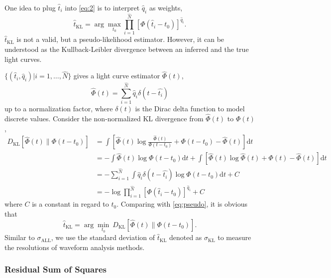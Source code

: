 One idea to plug $\hat{t}_i$ into \eqref{eq:2} is to interpret $\hat{q}_i$ as weights,
\begin{equation}
  \label{eq:pseudo}
  \hat{t}_\mathrm{KL} = \arg\underset{t_0}{\max} \prod_{i=1}^{\hat{N}} \left[\Phi(\hat{t}_i-t_0)\right]^{\hat{q}_i}.
\end{equation}
$\hat{t}_\mathrm{KL}$ is not a valid, but a pseudo-likelihood estimator. However, it can be understood as the Kullback-Leibler divergence between an inferred and the true light curves.

$\{(\hat{t}_i, \hat{q}_i)|i=1,\ldots,\hat{N}\}$ gives a light curve estimator $\hat{\Phi}(t)$,
\begin{equation}
  \label{eq:lc}
  \hat{\Phi}(t) = \sum_{i=1}^{\hat{N}} \hat{q}_i\delta(t-\hat{t_i})
\end{equation}
up to a normalization factor, where $\delta(t)$ is the Dirac delta function to model discrete values.  Consider the non-normalized KL divergence from $\hat{\Phi}(t)$ to $\Phi(t)$,
\begin{equation}
  \begin{aligned}
    D_\mathrm{KL}\left[\hat{\Phi}(t) \parallel \Phi(t-t_0)\right] & =\int \left[\hat{\Phi}(t) \log\frac{\hat{\Phi}(t)}{\Phi(t-t_0)} + \Phi(t-t_0) - \hat{\Phi}(t) \right]\mathrm{d}t \\
    & = - \int \hat{\Phi}(t) \log\Phi(t-t_0)\mathrm{d}t + \int \left[\hat{\Phi}(t) \log\hat{\Phi}(t) + \Phi(t) - \hat{\Phi}(t) \right]\mathrm{d}t \\
    & = - \sum_{i=1}^{\hat{N}}\int \hat{q}_i\delta(t-\hat{t_i}) \log\Phi(t-t_0)\mathrm{d}t + C \\
    & = -\log \prod_{i=1}^{\hat{N}} \left[\Phi(\hat{t}_i-t_0)\right]^{\hat{q}_i} + C
  \label{eq:kl}
  \end{aligned}
\end{equation}
where $C$ is a constant in regard to $t_0$.  Comparing with \eqref{eq:pseudo}, it is obvious that
\begin{equation}
  \label{eq:kl2}
  \hat{t}_\mathrm{KL} = \arg\underset{t_0}{\min}~D_\mathrm{KL}\left[\hat{\Phi}(t) \parallel \Phi(t-t_0)\right].
\end{equation}
Similar to $\sigma_\mathrm{ALL}$, we use the standard deviation of $\hat{t}_\mathrm{KL}$ denoted as $\sigma_\mathrm{KL}$ to measure the resolutions of waveform analysis methods.

\subsubsection{Residual Sum of Squares}
\label{sec:rss}


